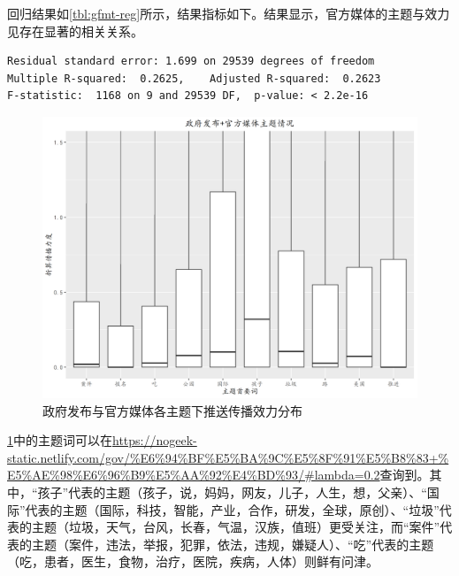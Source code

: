 \documentclass[a4paper,12pt,UTF8]{article}
\begin{document}
    回归结果如\cref{tbl:gfmt-reg}所示，结果指标如下。结果显示，官方媒体的主题与效力见存在显著的相关关系。
    \begin{lstlisting}
Residual standard error: 1.699 on 29539 degrees of freedom
Multiple R-squared:  0.2625,	Adjusted R-squared:  0.2623 
F-statistic:  1168 on 9 and 29539 DF,  p-value: < 2.2e-16
    \end{lstlisting}
    
    \begin{figure}[htbp]
      \centering
      \includegraphics[width=0.9\linewidth]{政府发布+官方媒体.png}
      \caption{政府发布与官方媒体各主题下推送传播效力分布}
      \label{fig:zffbgfmt-box}
    \end{figure}
    \cref{fig:zffbgfmt-box}中的主题词可以在\url{https://nogeek-static.netlify.com/gov/%E6%94%BF%E5%BA%9C%E5%8F%91%E5%B8%83+%E5%AE%98%E6%96%B9%E5%AA%92%E4%BD%93/#lambda=0.2}查询到。其中，“孩子”代表的主题（孩子，说，妈妈，网友，儿子，人生，想，父亲）、“国际”代表的主题（国际，科技，智能，产业，合作，研发，全球，原创）、“垃圾”代表的主题（垃圾，天气，台风，长春，气温，汉族，值班）更受关注，而“案件”代表的主题（案件，违法，举报，犯罪，依法，违规，嫌疑人）、“吃”代表的主题（吃，患者，医生，食物，治疗，医院，疾病，人体）则鲜有问津。
\end{document}
